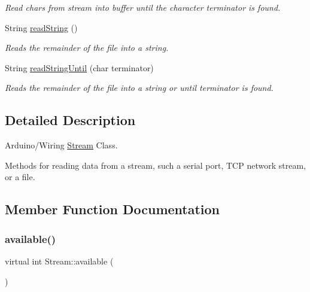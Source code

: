 \begin{DoxyCompactItemize}
\begin{DoxyCompactList}\small\item\em Read chars from stream into buffer until the character terminator is found. \end{DoxyCompactList}\item 
\mbox{\label{class_stream_a1c60bdda2b65d78e5a1362d51b856c5a}} 
String \mbox{\hyperlink{class_stream_a1c60bdda2b65d78e5a1362d51b856c5a}{read\+String}} ()
\begin{DoxyCompactList}\small\item\em Reads the remainder of the file into a string. \end{DoxyCompactList}\item 
String \mbox{\hyperlink{class_stream_a6a409da87c552909260d8cc428c5ca70}{read\+String\+Until}} (char terminator)
\begin{DoxyCompactList}\small\item\em Reads the remainder of the file into a string or until terminator is found. \end{DoxyCompactList}\end{DoxyCompactItemize}


\subsection{Detailed Description}
Arduino/\+Wiring \mbox{\hyperlink{class_stream}{Stream}} Class. 

Methods for reading data from a stream, such a serial port, T\+CP network stream, or a file. 

\subsection{Member Function Documentation}
\mbox{\label{class_stream_a9c98a763395005c08ce95afb2f06c7b1}} 
\subsubsection{\texorpdfstring{available()}{available()}}
{\footnotesize\ttfamily virtual int Stream\+::available (\begin{DoxyParamCaption}{ }\end{DoxyParamCaption})\hspace{0.3cm}{\ttfamily [pure virtual]}}



